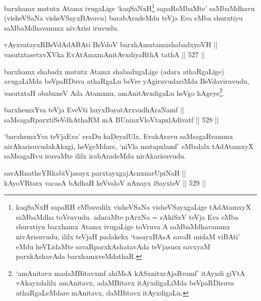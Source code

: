 \begin{artha}
barxhamx matutx Atamx ivugaLige `kaqSaNxH\footnote{kaqSaNxH sapaRH
eMbuvalilx visheVSaNa visheVSayxgaLige tAdAtamxyX saMbaMdha toVruvudu.
adaraMte pArxNa = sAkiSxV teVja Eva eMba shurxtiyu barxhamx Atamx
ivugaLige toVruva A saMbaMdhavanunx nivArisuvudu, ililx teVjaH padakekx
`tasayxBAsA savaR midaM viBAti' eMdu heVLidaMte savaRparxkAshatavAda
teVjasusx savxyaM parxkAshavAda barxhamxveMdathaR.} sapaReMbaMte'
saMbaMdhavu (visheVSaNa visheVSayxBAvavu) barabAradeMdu teVja Eva eMba
shurxtiyu saMbaMdhavanunx nivArisi iruvudu.
\end{artha}


\begin{shl}
vAyxvatayxRBeVdAdABAti BeVdoV barxhAmxtamxshabadxyoVH ||  \\
vasutxtasetxvXVka EvA\s \s tAmx\s mAnitAvxdiyaRthA tathA \hfill || 527 ||  
\end{shl}

\begin{artha}
barxhamx shabadx matutx Atamx shabadxgaLige (adara athaRgaLige)
avugaLiMda beVpaRDuva athaRgaLu beVre yAgiruvudariMda BeVdaviruvudu,
vasutxtaH obabxneV Ada Atamxnu, amAnitAvxdigaLu heVgo
hAgeye\footnote{`amAnitavx madaMBitavxmf ahiMsA kASxnitxrAjaRvamf'
itAyxdi giVtA vAkayxdalilx amAnitavx, adaMBitavx itAyxdigaLiMda
beVpaRDisuva athaRgaLeMdare mAnitavx, daMBitavx itAyxdigaLu.}.
\end{artha}

\begin{shl}
\footnotemark[4]barxhemxYva teVja EveVti huyxBayatArxvadhAraNamf ||  \\
saMsagaRparxtiSeVdhAthaRM mA BUninxVloVtapxlAdivatf \hfill || 528 ||  
\end{shl}

\begin{artha}
`barxhemxYva teVjaEva' eraDu kaDeyalUlx, EvakAravu
saMsagaRvanunx nirAkarisuvudakAkxgi, heVgeMdare, `niVla mutapxlamf'
eMbalalx tAdAtamxyX saMsagaRvu iruvaMte ililx irabAradeMdu
nirAkarisuvudu.
\end{artha}


\begin{shl}
savARnatheYRkabiVjasayx parxtayxgajAcnxnarUpiNaH || \\
kAyoVR\s tarx vacasA bAdhaH keVvaloV nAnayx iSayxteV \hfill || 529 ||  
\end{shl}

